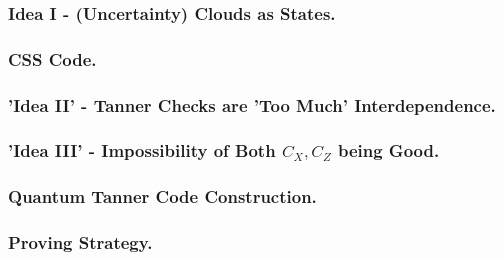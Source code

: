 \documentclass[usenames, aspectratio=169]{beamer}
\theoremstyle{claim}
\theoremstyle{remark}
\begin{document}
\begin{frame}
  \frametitle{ Idea I - (Uncertainty) Clouds as States. }
\end{frame}
\begin{frame}
  \frametitle{ CSS Code.  }
\end{frame}

\begin{frame}
  \frametitle{ 'Idea II' - Tanner Checks are 'Too Much' Interdependence.}
\end{frame}

\begin{frame}
  \frametitle{ 'Idea III' - Impossibility of Both $C_{X},C_{Z}$ being Good.}
\end{frame}

\begin{frame}
  \frametitle{ Quantum Tanner Code Construction.}
\end{frame}

\begin{frame}
  \frametitle{ Proving Strategy. }
\end{frame}

\end{document}
